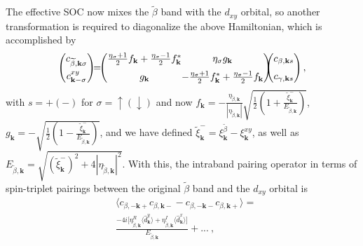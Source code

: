 \documentclass[%
reprint,
superscriptaddress,
 amsmath,amssymb,
 aps,
prb,
nobalancelastpage,
]{revtex4-2}
\begin{document}
The effective SOC now mixes the $\widetilde{\beta}$ band with the $d_{xy}$ orbital, so another transformation is required to diagonalize the above Hamiltonian, which is accomplished by
\begin{equation} \label{last_trsf}
\begin{aligned}
\begin{pmatrix}
   c_{\widetilde{\beta},\textbf{k}\sigma} \\[6pt]
   c^{xy}_{\textbf{k}-\sigma} \\
 \end{pmatrix}\hspace{-1.5mm}
 \setlength\arraycolsep{0.005mm}
 = \hspace{-1.5mm}\begin{pmatrix} 
    \frac{\eta_{\sigma}+1}{2}f_{\textbf{k}}+\frac{\eta_{\sigma}-1}{2}f_{\textbf{k}}^{*} & \eta_{\sigma}g_{\textbf{k}}  \\[6pt]
  g_{\textbf{k}} & -\frac{\eta_{\sigma}+1}{2}f_{\textbf{k}}^{*}+\frac{\eta_{\sigma}-1}{2}f_{\textbf{k}}
\end{pmatrix}\hspace{-2.5mm}
\begin{pmatrix}
   c_{\beta,\textbf{k}s} \\[6pt]
   c_{\gamma,\textbf{k}s} \\
 \end{pmatrix},
\end{aligned}
\end{equation}
with $s=+(-)$ for $\sigma=\uparrow(\downarrow)$ and now $f_{\textbf{k}} = -\frac{\eta_{\widetilde{\beta},\textbf{k}}}{|\eta_{\widetilde{\beta},\textbf{k}}|}\sqrt{\frac{1}{2}(1 + \frac{\widetilde{\xi}_{\textbf{k}}^{-}}{E_{\widetilde{\beta},\textbf{k}}})}$, $g_{\textbf{k}} = -\sqrt{\frac{1}{2}(1-\frac{\widetilde{\xi}_{\textbf{k}}^{-}}{E_{\widetilde{\beta},\textbf{k}}})}$, and we have defined $\widetilde{\xi}_{\textbf{k}}^{-} = \xi_{\textbf{k}}^{\widetilde{\beta}}-\xi_{\textbf{k}}^{xy}$, as well as $E_{\widetilde{\beta},\textbf{k}} = \sqrt{(\widetilde{\xi}_{\textbf{k}}^{-})^2 + 4|\eta_{\widetilde{\beta},\textbf{k}}|^2}$. With this, the intraband pairing operator in terms of spin-triplet pairings between the original $\widetilde{\beta}$ band and the $d_{xy}$ orbital is
\begin{equation}    \label{intra_general}
\begin{aligned}
    &\langle{c_{\beta,-\textbf{k}+}c_{\beta,\textbf{k}-} - c_{\beta,-\textbf{k}-}c_{\beta,\textbf{k}+}}\rangle = \\[6pt] &\frac{-4i\bigl[\eta_{\widetilde{\beta},\textbf{k}}^{R}\langle{\hat{d}_{\textbf{k}}^{y}}\rangle + \eta_{\widetilde{\beta},\textbf{k}}^{I}\langle{\hat{d}_{\textbf{k}}^{x}}\rangle \bigr]}{E_{\widetilde{\beta},\textbf{k}}} + ...~,
\end{aligned}
\end{equation}
\end{document}
